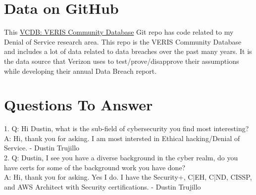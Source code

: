 \section{Data on GitHub}
This \href{https://github.com/vz-risk/VCDB}{VCDB: VERIS Community Database} Git repo has code related to my Denial of Service research area. This repo is the VERIS Community Database and includes a lot of data related to data breaches over the past many years. It is the data source that Verizon uses to test/prove/disapprove their assumptions while developing their annual Data Breach report.

\section{Questions To Answer}
1. Q: Hi Dustin, what is the sub-field of cybersecurity you find most interesting?
\\
A: Hi, thank you for asking. I am most intersted in Ethical hacking/Denial of Service. - Dustin Trujillo
\\
2. Q: Dustin, I see you have a diverse background in the cyber realm, do you have certs for some of the background work you have done?
\\
A: Hi, thank you for asking. Yes I do. I have the Security+, C|EH, C|ND, CISSP, and AWS Architect with Security certifications. - Dustin Trujillo
